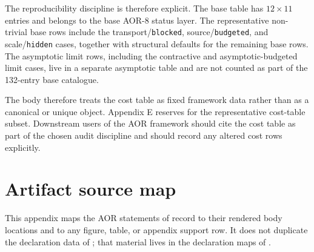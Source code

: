 \documentclass[11pt]{article}
\theoremstyle{definition}
\begin{document}
The reproducibility discipline is therefore explicit.  The base table
has \(12\times 11\) entries and belongs to the base AOR-8 status layer.
The representative non-trivial base rows include the
transport/\texttt{blocked}, source/\texttt{budgeted}, and
scale/\texttt{hidden} cases, together with structural defaults for the
remaining base rows.  The asymptotic limit rows, including the
contractive and asymptotic-budgeted limit cases, live in a separate
asymptotic table and are not counted as part of the 132-entry base
catalogue.

The body therefore treats the cost table as fixed framework data
rather than as a canonical or unique object.  Appendix E reserves
 for the representative
cost-table subset.  Downstream users of the AOR framework should cite
the cost table as part of the chosen audit discipline and should record any
altered cost rows explicitly.
 \section{Artifact source map}\label{app:artifact-map}

This appendix maps the AOR statements of record to their rendered body
locations and to any figure, table, or appendix support row.  It does
not duplicate the declaration data of ;
that material lives in the declaration maps of
.
\end{document}
